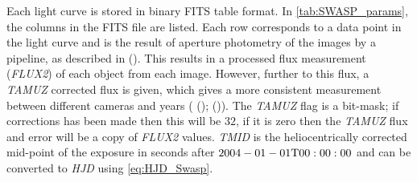 \begin{table}[]
\centering
\caption{Data available for each photometric point  (\citeyear{2006PASP..118.1407P}) in the \textit{SuperWASP} DR1  (\citeyear{2010A&A...520L..10B})}
\label{tab:SWASP_params}
\end{table}

Each light curve is stored in binary FITS table format. In \autoref{tab:SWASP_params}, the columns in the FITS file are listed. Each row corresponds to a data point in the light curve and is the result of aperture photometry of the images by a pipeline, as described in  (\citeyear{2005MNRAS.364.1091K}). This results in a processed flux measurement (\textit{FLUX2}) of each object from each image. However, further to this flux, a \textit{TAMUZ} corrected flux is given, which gives a more consistent measurement between different cameras and years ( (\citeyear{2007MNRAS.380.1230C});  (\citeyear{2010A&A...520L..10B})). The \textit{TAMUZ} flag is a bit-mask; if corrections has been made then this will be $32$, if it is zero then the \textit{TAMUZ} flux and error will be a copy of \textit{FLUX2} values. \textit{TMID} is the heliocentrically corrected mid-point of the exposure in seconds after $2004-01-01\textnormal{T}00:00:00$ and can be converted to \textit{HJD} using \autoref{eq:HJD_Swasp}.\\ 

